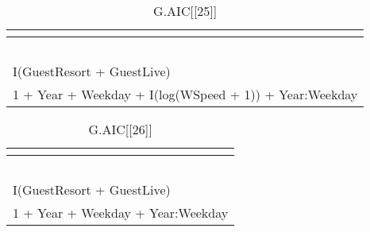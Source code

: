 %
\begin{table}[!tbp]
\caption{G.AIC[[25]]\label{G.AIC[[25]]}} 
\begin{center}
\begin{tabular}{l}
\hline\hline
\multicolumn{1}{c}{}\tabularnewline
\hline
~\tabularnewline
I(GuestResort + GuestLive)\tabularnewline
1 + Year + Weekday + I(log(WSpeed + 1)) + Year:Weekday\tabularnewline
\hline
\end{tabular}
\end{center}
\end{table}

%
\begin{table}[!tbp]
\caption{G.AIC[[26]]\label{G.AIC[[26]]}} 
\begin{center}
\begin{tabular}{l}
\hline\hline
\multicolumn{1}{c}{}\tabularnewline
\hline
~\tabularnewline
I(GuestResort + GuestLive)\tabularnewline
1 + Year + Weekday + Year:Weekday\tabularnewline
\hline
\end{tabular}
\end{center}
\end{table}

